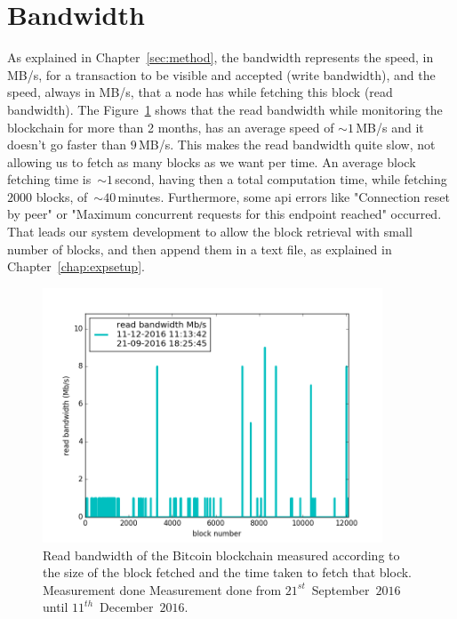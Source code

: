 \documentclass[USenglish]{uit-thesis}
\begin{document}
\section{Bandwidth}
\label{sec:bandwidth}
As explained in Chapter~\ref{sec:method}, the bandwidth represents the speed,
in MB/s, for a transaction to be visible and accepted (write bandwidth), and the speed, always in MB/s, that
a node has while fetching this block (read bandwidth). The Figure~\ref{fig:bandwidth}
shows that the read bandwidth while monitoring the blockchain for more than 2 months,
has an average speed of $\sim1$\,MB/s and it doesn't go faster than $9$\,MB/s. This
makes the read bandwidth quite slow, not allowing us to fetch as many blocks as we want
per time. An average block fetching time is~$\sim1$\,second,
having then a total computation time, while fetching $2000$ blocks, of~$\sim40$\,minutes.
Furthermore, some \gls{api} errors like "Connection reset by peer" or "Maximum concurrent
requests for this endpoint reached" occurred. That leads our system development to
allow the block retrieval with small number of blocks, and then append them in a text file,
as explained in Chapter~\ref{chap:expsetup}.

\begin{figure}[h]
	\centering
	\includegraphics[width=0.9\textwidth]{img/bandwidth}
	\caption{Read bandwidth of the Bitcoin blockchain measured according to
		the size of the block fetched and the time taken to fetch that block.
		Measurement done Measurement done from $21^{st}$~September~$2016$ until
		$11^{th}$~December~$2016$.}
	\label{fig:bandwidth}
\end{figure}
\end{document}
